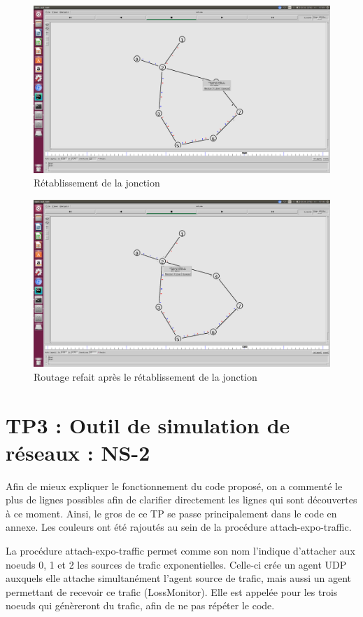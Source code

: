 \documentclass{article}
\begin{document}
    \begin{figure}
    \centering
    \includegraphics[width=0.99\columnwidth]{tp2-1-LS-3-relink.png}
    \caption{Rétablissement de la jonction}
    \end{figure}
    \begin{figure}
    \centering
    \includegraphics[width=0.99\columnwidth]{tp2-1-LS-4-relink_triggered.png}
    \caption{Routage refait après le rétablissement de la jonction}
    \end{figure}
    \clearpage
    \section{TP3 : Outil de simulation de réseaux : NS-2}
    Afin de mieux expliquer le fonctionnement du code proposé, on a commenté le plus de lignes possibles afin de clarifier directement les lignes qui sont découvertes à ce moment. Ainsi, le gros de ce TP se passe principalement dans le code en annexe. Les couleurs ont été rajoutés au sein de la procédure attach-expo-traffic.
    
    La procédure attach-expo-traffic permet comme son nom l'indique d'attacher aux noeuds 0, 1 et 2 les sources de trafic exponentielles. Celle-ci crée un agent UDP auxquels elle attache simultanément l'agent source de trafic, mais aussi un agent permettant de recevoir ce trafic (LossMonitor). Elle est appelée pour les trois noeuds qui génèreront du trafic, afin de ne pas répéter le code.
    
\end{document}
